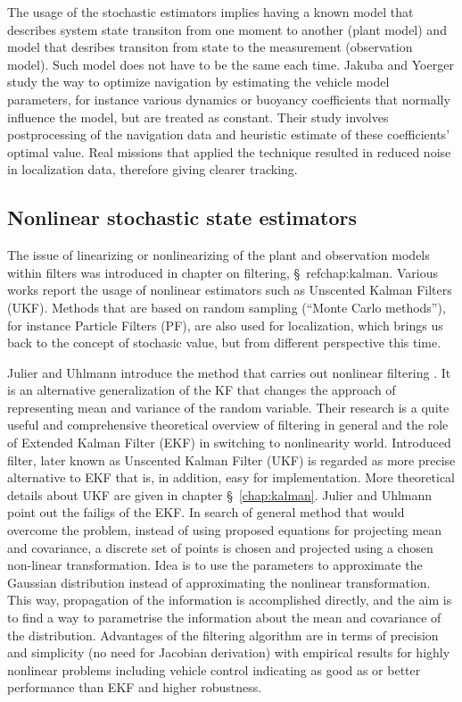 The usage of the stochastic estimators implies having a known model that describes system state transiton from one moment to another (plant model) and model that desribes transiton from state to the measurement (observation model). Such model does not have to be the same each time. Jakuba and Yoerger \cite{jakuba03} study the way to optimize navigation by estimating the vehicle model parameters, for instance various dynamics or buoyancy coefficients that normally influence the model, but are treated as constant. Their study involves postprocessing of the navigation data and heuristic estimate of these coefficients' optimal value. Real missions that applied the technique resulted in reduced noise in localization data, therefore giving clearer tracking. 

\subsection{Nonlinear stochastic state estimators}

The issue of linearizing or nonlinearizing of the plant and observation models within filters was introduced in chapter on filtering, \S~ref{chap:kalman}. Various works report the usage of nonlinear estimators such as Unscented Kalman Filters (UKF). Methods that are based on random sampling (``Monte Carlo methods''), for instance Particle Filters (PF), are also used for localization, which brings us back to the concept of stochasic value, but from different perspective this time.

Julier and Uhlmann introduce the method that carries out nonlinear filtering \cite{julier96}. It is an alternative generalization of the KF that changes the approach of representing mean and variance of the random variable. Their research is a quite useful and comprehensive theoretical overview of filtering in general and the role of Extended Kalman Filter (EKF) in switching to nonlinearity world. Introduced filter, later known as Unscented Kalman Filter (UKF) is regarded as more precise alternative to EKF that is, in addition, easy for implementation. More theoretical details about UKF are given in chapter \S~\ref{chap:kalman}.    Julier and Uhlmann point out the failigs of the EKF. In search of general method that would overcome the problem, instead of using proposed equations for projecting mean and covariance, a discrete set of points is chosen and projected using a chosen non-linear transformation. Idea is to use the parameters to approximate the Gaussian distribution instead of approximating the nonlinear transformation. This way, propagation of the information is accomplished directly, and the aim is to find a way to parametrise the information about the mean and covariance of the distribution. Advantages of the filtering algorithm are in terms of precision and simplicity (no need for Jacobian derivation) with empirical results for highly nonlinear problems including vehicle control indicating as good as or better performance than EKF and higher robustness.
  
